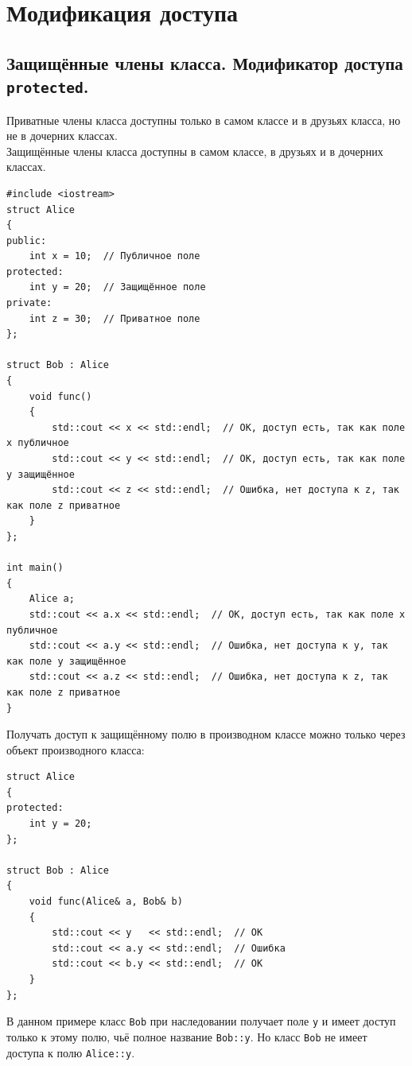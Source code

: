 \documentclass{article}
\begin{document}
\newpage
\section*{Модификация доступа}

\subsection*{Защищённые члены класса. Модификатор доступа \texttt{protected}.}
Приватные члены класса доступны только в самом классе и в друзьях класса, но не в дочерних классах.\\
Защищённые члены класса доступны в самом классе, в друзьях и в дочерних классах.
\begin{lstlisting}
#include <iostream>
struct Alice
{
public:
	int x = 10;  // Публичное поле
protected:
	int y = 20;  // Защищённое поле
private:
	int z = 30;  // Приватное поле
};

struct Bob : Alice
{
	void func() 
	{
		std::cout << x << std::endl;  // ОК, доступ есть, так как поле x публичное
		std::cout << y << std::endl;  // ОК, доступ есть, так как поле y защищённое
		std::cout << z << std::endl;  // Ошибка, нет доступа к z, так как поле z приватное
	}  
};

int main()
{
	Alice a;
	std::cout << a.x << std::endl;  // ОК, доступ есть, так как поле x публичное
	std::cout << a.y << std::endl;  // Ошибка, нет доступа к y, так как поле y защищённое
	std::cout << a.z << std::endl;  // Ошибка, нет доступа к z, так как поле z приватное
}
\end{lstlisting}
Получать доступ к защищённому полю в производном классе можно только через объект производного класса:
\begin{lstlisting}
struct Alice
{
protected:
    int y = 20;
};

struct Bob : Alice
{
    void func(Alice& a, Bob& b) 
    {
        std::cout << y   << std::endl;  // ОК
        std::cout << a.y << std::endl;  // Ошибка
        std::cout << b.y << std::endl;  // ОК
    }  
};
\end{lstlisting}
В данном примере класс \texttt{Bob} при наследовании получает поле \texttt{y} и имеет доступ только к этому полю, чьё полное название \texttt{Bob::y}. Но класс \texttt{Bob} не имеет доступа к полю \texttt{Alice::y}.
\end{document}
